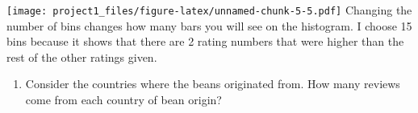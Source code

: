 \documentclass[
]{article}
\newenvironment{Shaded}{\begin{snugshade}}{\end{snugshade}}
\newcommand{\FunctionTok}[1]{\textcolor[rgb]{0.13,0.29,0.53}{\textbf{#1}}}
\newcommand{\NormalTok}[1]{#1}
\newcommand{\SpecialCharTok}[1]{\textcolor[rgb]{0.81,0.36,0.00}{\textbf{#1}}}
\providecommand{\tightlist}{%
  \setlength{\itemsep}{0pt}\setlength{\parskip}{0pt}}
\begin{document}
\texttt{[image: project1\_files/figure-latex/unnamed-chunk-5-5.pdf]}
Changing the number of bins changes how many bars you will see on the
histogram. I choose 15 bins because it shows that there are 2 rating
numbers that were higher than the rest of the other ratings given.

\begin{enumerate}
\def\labelenumi{\arabic{enumi}.}
\setcounter{enumi}{1}
\tightlist
\item
  Consider the countries where the beans originated from. How many
  reviews come from each country of bean origin?
\end{enumerate}

\begin{Shaded}
\end{Shaded}
\end{document}
